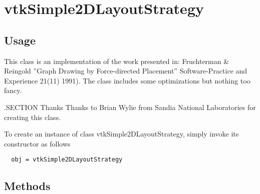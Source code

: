 \section{vtkSimple2DLayoutStrategy}

\subsection{Usage}

 This class is an implementation of the work presented in:
 Fruchterman \& Reingold ''Graph Drawing by Force-directed Placement'' 
 Software-Practice and Experience 21(11) 1991).
 The class includes some optimizations but nothing too fancy.

 .SECTION Thanks
 Thanks to Brian Wylie from Sandia National Laboratories for creating this
 class.

To create an instance of class vtkSimple2DLayoutStrategy, simply
invoke its constructor as follows
\begin{verbatim}
  obj = vtkSimple2DLayoutStrategy
\end{verbatim}
\subsection{Methods}

